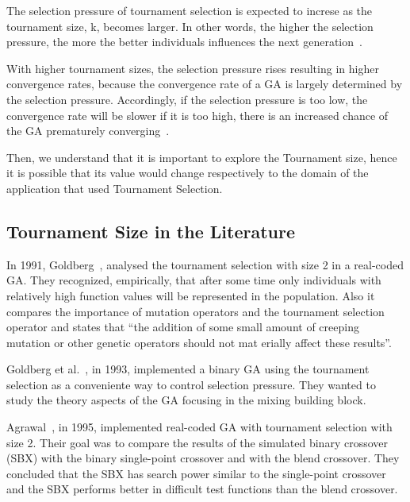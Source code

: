 The selection pressure of tournament selection is expected to increse as the tournament size, k, becomes larger. In other words, the higher the selection pressure, the more the better individuals influences the next generation~\cite{miller1995genetic}.  

With higher tournament sizes, the selection pressure rises resulting in higher convergence rates, because the convergence rate of a GA is largely determined by the selection pressure.  Accordingly, if the selection pressure is too low, the convergence rate will be slower if it is too high, there is an increased chance of the GA prematurely converging~\cite{miller1995genetic}. 

Then, we understand that it is important to explore the Tournament size, hence it is possible that its value would change respectively to the domain of the application that used Tournament Selection.

\subsection{Tournament Size in the Literature}\label{sec:background:tournament_size} 

In 1991, Goldberg~\cite{goldberg1991real}, analysed the tournament selection with size 2 in a real-coded GA. They recognized, empirically, that after some time only individuals with relatively high function values will be represented in the population. Also it compares the importance of mutation operators and the tournament selection operator and states that ``the addition of some small amount of creeping mutation or other genetic operators should not mat erially affect these results''.

Goldberg et al.~\cite{goldberg1993toward}, in 1993, implemented a binary GA using the tournament selection as a conveniente way to control selection pressure. They wanted to study the theory aspects of the GA focusing in the mixing building block.

Agrawal~\cite{agrawal1995simulated}, in 1995, implemented real-coded GA with tournament selection with size 2. Their goal was to compare the results of the simulated binary crossover (SBX) with the binary single-point crossover and with the blend crossover. They concluded that the SBX  has search power similar to the single-point crossover and the SBX performs better in difficult test functions than the blend crossover. 

